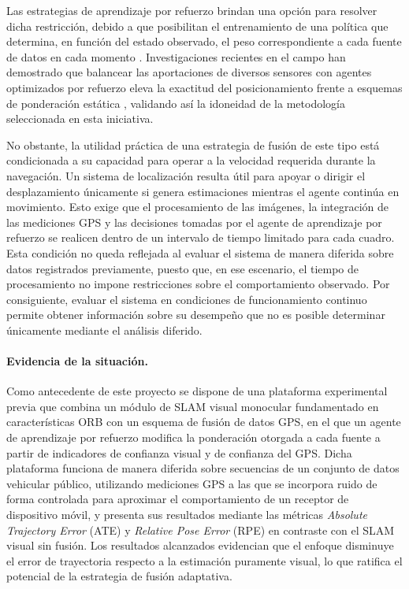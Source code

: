 Las estrategias de aprendizaje por refuerzo brindan una opción para resolver dicha restricción, debido a que posibilitan el entrenamiento de una política que determina, en función del estado observado, el peso correspondiente a cada fuente de datos en cada momento \cite{sutton2018rl}.
Investigaciones recientes en el campo han demostrado que balancear las aportaciones de diversos sensores con agentes optimizados por refuerzo eleva la exactitud del posicionamiento frente a esquemas de ponderación estática \cite{jia2021lviofusion, wong2024drlslam}, validando así la idoneidad de la metodología seleccionada en esta iniciativa.

No obstante, la utilidad práctica de una estrategia de fusión de este tipo está condicionada a su capacidad para operar a la velocidad requerida durante la navegación.
Un sistema de localización resulta útil para apoyar o dirigir el desplazamiento únicamente si genera estimaciones mientras el agente continúa en movimiento. Esto exige que el procesamiento de las imágenes, la integración de las mediciones GPS y las decisiones tomadas por el agente de aprendizaje por refuerzo se realicen dentro de un intervalo de tiempo limitado para cada cuadro.
Esta condición no queda reflejada al evaluar el sistema de manera diferida sobre datos registrados previamente, puesto que, en ese escenario, el tiempo de procesamiento no impone restricciones sobre el comportamiento observado.
Por consiguiente, evaluar el sistema en condiciones de funcionamiento continuo permite obtener información sobre su desempeño que no es posible determinar únicamente mediante el análisis diferido.

\paragraph{Evidencia de la situación.} Como antecedente de este proyecto se dispone de una plataforma experimental previa que combina un módulo de SLAM visual monocular fundamentado en características ORB con un esquema de fusión de datos GPS, en el que un agente de aprendizaje por refuerzo modifica la ponderación otorgada a cada fuente a partir de indicadores de confianza visual y de confianza del GPS.
Dicha plataforma funciona de manera diferida sobre secuencias de un conjunto de datos vehicular público, utilizando mediciones GPS a las que se incorpora ruido de forma controlada para aproximar el comportamiento de un receptor de dispositivo móvil, y presenta sus resultados mediante las métricas \textit{Absolute Trajectory Error} (ATE) y \textit{Relative Pose Error} (RPE) en contraste con el SLAM visual sin fusión.
Los resultados alcanzados evidencian que el enfoque disminuye el error de trayectoria respecto a la estimación puramente visual, lo que ratifica el potencial de la estrategia de fusión adaptativa.

